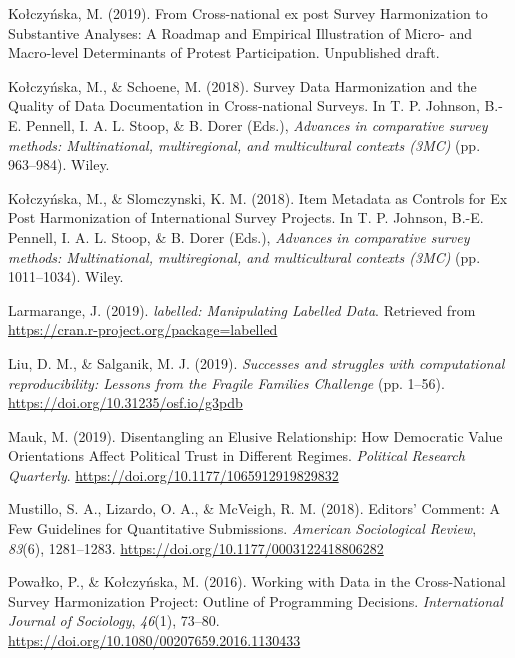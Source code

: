 \documentclass[12pt,]{article}
\begin{document}
\leavevmode\hypertarget{ref-Kolczynska2019}{}%
Kołczyńska, M. (2019). From Cross-national ex post Survey Harmonization to Substantive Analyses: A Roadmap and Empirical Illustration of Micro- and Macro-level Determinants of Protest Participation. Unpublished draft.

\leavevmode\hypertarget{ref-KolczynskaSchoene2018}{}%
Kołczyńska, M., \& Schoene, M. (2018). Survey Data Harmonization and the Quality of Data Documentation in Cross‐national Surveys. In T. P. Johnson, B.-E. Pennell, I. A. L. Stoop, \& B. Dorer (Eds.), \emph{Advances in comparative survey methods: Multinational, multiregional, and multicultural contexts (3MC)} (pp. 963--984). Wiley.

\leavevmode\hypertarget{ref-KolczynskaSlomczynski2018}{}%
Kołczyńska, M., \& Slomczynski, K. M. (2018). Item Metadata as Controls for Ex Post Harmonization of International Survey Projects. In T. P. Johnson, B.-E. Pennell, I. A. L. Stoop, \& B. Dorer (Eds.), \emph{Advances in comparative survey methods: Multinational, multiregional, and multicultural contexts (3MC)} (pp. 1011--1034). Wiley.

\leavevmode\hypertarget{ref-labelled}{}%
Larmarange, J. (2019). \emph{labelled: Manipulating Labelled Data}. Retrieved from \url{https://cran.r-project.org/package=labelled}

\leavevmode\hypertarget{ref-Liu2019}{}%
Liu, D. M., \& Salganik, M. J. (2019). \emph{Successes and struggles with computational reproducibility: Lessons from the Fragile Families Challenge} (pp. 1--56). \url{https://doi.org/10.31235/osf.io/g3pdb}

\leavevmode\hypertarget{ref-Mauk2019}{}%
Mauk, M. (2019). Disentangling an Elusive Relationship: How Democratic Value Orientations Affect Political Trust in Different Regimes. \emph{Political Research Quarterly}. \url{https://doi.org/10.1177/1065912919829832}

\leavevmode\hypertarget{ref-Mustillo2018}{}%
Mustillo, S. A., Lizardo, O. A., \& McVeigh, R. M. (2018). Editors' Comment: A Few Guidelines for Quantitative Submissions. \emph{American Sociological Review}, \emph{83}(6), 1281--1283. \url{https://doi.org/10.1177/0003122418806282}

\leavevmode\hypertarget{ref-Powako2016}{}%
Powałko, P., \& Kołczyńska, M. (2016). Working with Data in the Cross-National Survey Harmonization Project: Outline of Programming Decisions. \emph{International Journal of Sociology}, \emph{46}(1), 73--80. \url{https://doi.org/10.1080/00207659.2016.1130433}
\end{document}

